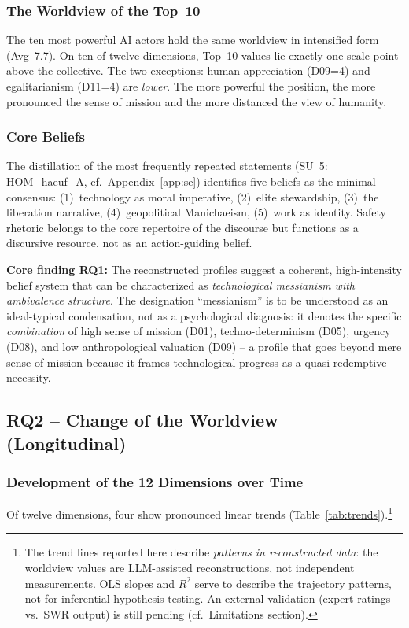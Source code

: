 \documentclass[12pt,a4paper]{article}
\begin{document}
\subsubsection{The Worldview of the Top~10}

The ten most powerful AI actors hold the same worldview in intensified form (Avg~7.7). On ten of twelve dimensions, Top~10 values lie exactly one scale point above the collective. The two exceptions: human appreciation (D09=4) and egalitarianism (D11=4) are \emph{lower}. The more powerful the position, the more pronounced the sense of mission and the more distanced the view of humanity.


\subsubsection{Core Beliefs}

The distillation of the most frequently repeated statements (SU~5: HOM\_haeuf\_A, cf.\ Appendix~\ref{app:se}) identifies five beliefs as the minimal consensus: (1)~technology as moral imperative, (2)~elite stewardship, (3)~the liberation narrative, (4)~geopolitical Manichaeism, (5)~work as identity. Safety rhetoric belongs to the core repertoire of the discourse but functions as a discursive resource, not as an action-guiding belief.

\medskip
\noindent\textbf{Core finding RQ1:} The reconstructed profiles suggest a coherent, high-intensity belief system that can be characterized as \emph{technological messianism with ambivalence structure}. The designation ``messianism'' is to be understood as an ideal-typical condensation, not as a psychological diagnosis: it denotes the specific \emph{combination} of high sense of mission (D01), techno-determinism (D05), urgency (D08), and low anthropological valuation (D09) -- a profile that goes beyond mere sense of mission because it frames technological progress as a quasi-redemptive necessity.


\subsection{RQ2 -- Change of the Worldview (Longitudinal)}
\label{sec:ergebnisse:f2}

\subsubsection{Development of the 12 Dimensions over Time}

Of twelve dimensions, four show pronounced linear trends (Table~\ref{tab:trends}).\footnote{The trend lines reported here describe \textit{patterns in reconstructed data}: the worldview values are LLM-assisted reconstructions, not independent measurements. OLS slopes and $R^2$ serve to describe the trajectory patterns, not for inferential hypothesis testing. An external validation (expert ratings vs.\ SWR output) is still pending (cf.\ Limitations section).}
\end{document}
